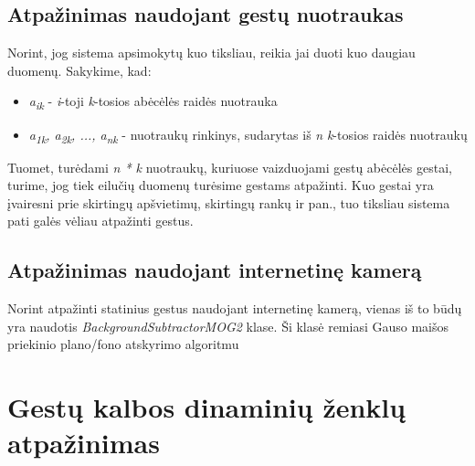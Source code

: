 \documentclass{VUMIFInfKursinis}
\begin{document}
\subsection{Atpažinimas naudojant gestų nuotraukas}
Norint, jog sistema apsimokytų kuo tiksliau, reikia jai duoti kuo daugiau duomenų. Sakykime, kad:
\begin{itemize}
	\item\textit{a\textsubscript{ik}} - \textit{i}-toji \textit{k}-tosios abėcėlės raidės nuotrauka 
	\item\textit{a\textsubscript{1k}, a\textsubscript{2k}, ..., a\textsubscript{nk}} - nuotraukų rinkinys, sudarytas iš \textit{n} \textit{k}-tosios raidės nuotraukų
\end{itemize}
Tuomet, turėdami \textit{n * k} nuotraukų, kuriuose vaizduojami gestų abėcėlės gestai, turime, jog tiek eilučių duomenų turėsime gestams atpažinti. Kuo gestai yra įvairesni prie skirtingų apšvietimų, skirtingų rankų ir pan., tuo tiksliau sistema pati galės vėliau atpažinti gestus.


\subsection{Atpažinimas naudojant internetinę kamerą}
Norint atpažinti statinius gestus naudojant internetinę kamerą, vienas iš to būdų yra naudotis \textit{BackgroundSubtractorMOG2} klase. Ši klasė remiasi Gauso maišos priekinio plano/fono atskyrimo algoritmu


\section{Gestų kalbos dinaminių ženklų atpažinimas}
\end{document}
